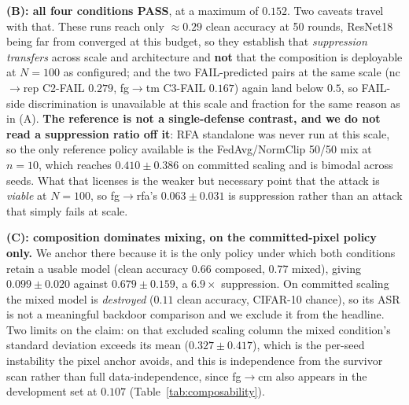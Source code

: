 \documentclass{article}
\begin{document}
\textbf{(B): all four conditions PASS}, at a maximum of $0.152$. Two caveats travel with that. These
runs reach only ${\approx}0.29$ clean accuracy at 50 rounds, ResNet18 being far from converged at
this budget, so they establish that \emph{suppression transfers} across scale and architecture and
\textbf{not} that the composition is deployable at $N{=}100$ as configured; and the two FAIL-predicted
pairs at the same scale (nc$\to$rep C2-FAIL $0.279$, fg$\to$tm C3-FAIL $0.167$) again land below
$0.5$, so FAIL-side discrimination is unavailable at this scale and fraction for the same reason as
in (A). \textbf{The reference is not a single-defense contrast, and we do not read a suppression
ratio off it}: RFA standalone was never run at this scale, so the only reference policy available is
the FedAvg/NormClip 50/50 mix at $n{=}10$, which reaches $0.410 \pm 0.386$ on committed scaling and
is bimodal across seeds. What that licenses is the weaker but necessary point that the attack is
\emph{viable} at $N{=}100$, so fg$\to$rfa's $0.063 \pm 0.031$ is suppression rather than an attack
that simply fails at scale.

\textbf{(C): composition dominates mixing, on the committed-pixel policy only.} We anchor there
because it is the only policy under which both conditions retain a usable model (clean accuracy
$0.66$ composed, $0.77$ mixed), giving $0.099 \pm 0.020$ against $0.679 \pm 0.159$, a $6.9\times$
suppression. On committed scaling the mixed model is \emph{destroyed} ($0.11$ clean accuracy,
CIFAR-10 chance), so its ASR is not a meaningful backdoor comparison and we exclude it from the
headline. Two limits on the claim: on that excluded scaling column the mixed
condition's standard deviation exceeds its mean ($0.327 \pm 0.417$), which is the per-seed
instability the pixel anchor avoids, and this is independence from the survivor scan rather
than full data-independence, since fg$\to$cm also appears in the development set at $0.107$
(Table~\ref{tab:composability}).

\end{document}
